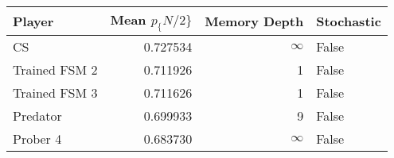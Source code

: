 \begin{tabular}{lrrl}
\toprule
        Player &  Mean $p_\{N/2\}$ &  Memory Depth & Stochastic \\
\midrule
            CS &        0.727534 &            \(\infty\) &      False \\
 Trained FSM 2 &        0.711926 &             1 &      False \\
 Trained FSM 3 &        0.711626 &             1 &      False \\
      Predator &        0.699933 &             9 &      False \\
      Prober 4 &        0.683730 &            \(\infty\) &      False \\
\bottomrule
\end{tabular}
